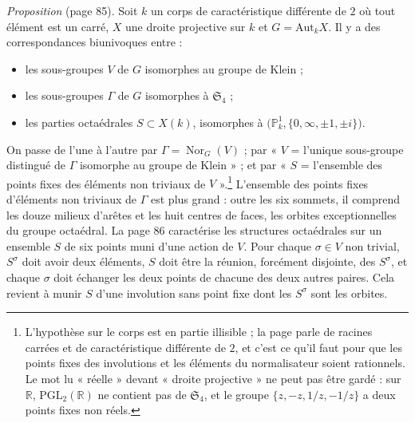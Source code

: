 \documentclass[11pt,a4paper]{article}
\begin{document}
\emph{Proposition} (page 85). Soit $k$ un corps de caractéristique
différente de $2$ où tout élément est un carré, $X$ une droite projective sur
$k$ et $G = \mathrm{Aut}_k X$. Il y a des correspondances biunivoques entre :
\begin{itemize}
  \item[a)] les sous-groupes $V$ de $G$ isomorphes au groupe de Klein ;
  \item[b)] les sous-groupes $\Gamma$ de $G$ isomorphes à $\mathfrak{S}_4$ ;
  \item[c)] les parties octaédrales $S \subset X(k)$, isomorphes à
  $\bigl(\mathbb{P}^{1}_k, \{0,\infty,\pm 1,\pm i\}\bigr)$.
\end{itemize}
On passe de l'une à l'autre par $\Gamma = \operatorname{Nor}_G(V)$ ; par
« $V$ = l'unique sous-groupe distingué de $\Gamma$ isomorphe au groupe de
Klein » ; et par « $S$ = l'ensemble des points fixes des éléments non
triviaux de $V$ ».\footnote{L'hypothèse sur le corps est en partie
illisible ; la page parle de racines carrées et de caractéristique
différente de $2$, et c'est ce qu'il faut pour que les points fixes des
involutions et les éléments du normalisateur soient rationnels. Le mot lu
« réelle » devant « droite projective » ne peut pas être gardé : sur
$\mathbb{R}$, $\mathrm{PGL}_2(\mathbb{R})$ ne contient pas de
$\mathfrak{S}_4$, et le groupe $\{z, -z, 1/z, -1/z\}$ a deux points fixes non
réels.} L'ensemble des points fixes d'éléments non triviaux de $\Gamma$ est
plus grand : outre les six sommets, il comprend les douze milieux d'arêtes et
les huit centres de faces, les orbites exceptionnelles du groupe octaédral.
La page 86 caractérise les structures octaédrales sur un ensemble $S$ de six
points muni d'une action de $V$. Pour chaque $\sigma \in V$ non trivial,
$S^{\sigma}$ doit avoir deux éléments, $S$ doit être la réunion, forcément
disjointe, des $S^{\sigma}$, et chaque $\sigma$ doit échanger les deux points
de chacune des deux autres paires. Cela revient à munir $S$ d'une involution
sans point fixe dont les $S^{\sigma}$ sont les orbites.
\end{document}
